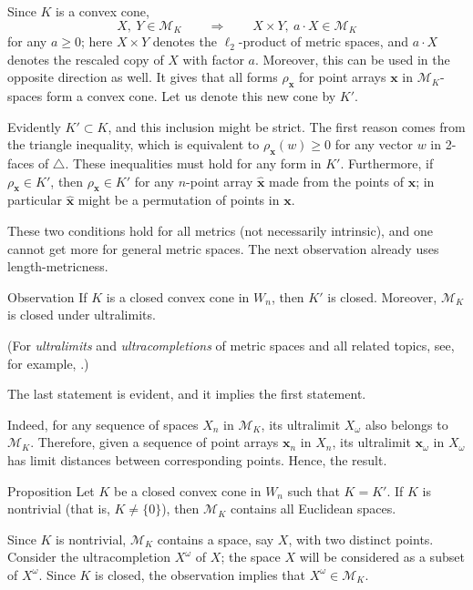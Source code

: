 \documentclass[a4paper,10pt]{article}
\begin{document}
Since $K$ is a convex cone,
\[X,\ Y\in  \mathcal{M}_K
\qquad\Longrightarrow\qquad
X\times Y,\ a\cdot X\in\mathcal{M}_K
\]
for any $a\ge 0$;
here $X\times Y$ denotes the $\ell_2$-product of metric spaces, and
$a\cdot X$ denotes the rescaled copy of $X$ with factor $a$.
Moreover, this can be used in the opposite direction as well.
It gives that all forms $\rho_{\bm{x}}$ for point arrays $\bm{x}$ in $\mathcal{M}_K$-spaces form a convex cone.
Let us denote this new cone by $K'$.

Evidently $K'\subset K$, and this inclusion might be strict.
The first reason comes from the triangle inequality, which is equivalent to $\rho_{\bm{x}}(w)\ge 0$ for any vector $w$ in 2-faces of $\triangle$.
These inequalities must hold for any form in $K'$.
Furthermore, if $\rho_{\bm{x}}\in K'$, then $\rho_{\hat{\bm{x}}}\in K'$ for any $n$-point array $\hat{\bm{x}}$ made from the points of $\bm{x}$; in particular $\hat{\bm{x}}$ might be a permutation of points in $\bm{x}$.

These two conditions hold for all metrics (not necessarily intrinsic),
and one cannot get more for general metric spaces.
The next observation already uses length-metricness.

\begin{thm}{Observation}
If $K$ is a closed convex cone in $W_n$, then $K'$ is closed.
Moreover, $\mathcal{M}_K$ is closed under ultralimits.
\end{thm}

(For \emph{ultralimits} and \emph{ultracompletions} of metric spaces and all related topics, see, for example, \cite{petrunin2023}.)

The last statement is evident, and it implies the first statement.

Indeed, for any sequence of spaces $X_n$ in $\mathcal{M}_K$, its ultralimit $X_\omega$ also belongs to $\mathcal{M}_K$.
Therefore, given a sequence of point arrays $\bm{x}_n$ in $X_n$,
its ultralimit $\bm{x}_\omega$ in $X_\omega$ has limit distances between corresponding points.
Hence, the result.
\qeds

\begin{thm}{Proposition}\label{prop:Associated form}
Let $K$ be a closed convex cone in $W_n$ such that $K=K'$.
If $K$ is nontrivial (that is, $K\ne \{0\}$), then $\mathcal{M}_K$ contains all Euclidean spaces.
\end{thm}

Since $K$ is nontrivial, $\mathcal{M}_K$ contains a space, say $X$, with two distinct points.
Consider the ultracompletion $X^\omega$ of $X$;
the space $X$ will be considered as a subset of $X^\omega$.
Since $K$ is closed, the observation implies that $X^\omega\in \mathcal{M}_K$.
\end{document}
